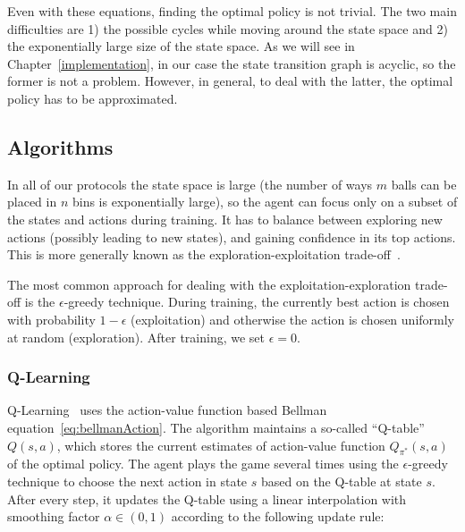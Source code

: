 Even with these equations, finding the optimal policy is not trivial. The two main difficulties are 1) the possible cycles while moving around the state space and 2) the exponentially large size of the state space. As we will see in Chapter~\ref{implementation}, in our case the state transition graph is acyclic, so the former is not a problem. However, in general, to deal with the latter, the optimal policy has to be approximated.



\subsection{Algorithms}


In all of our protocols the state space is large (the number of ways $m$ balls can be placed in $n$ bins is exponentially large), so the agent can focus only on a subset of the states and actions during training. It has to balance between exploring new actions (possibly leading to new states), and gaining confidence in its top actions. This is more generally known as the exploration-exploitation trade-off~\cite{kaelbling1996explorationexploitation}.

The most common approach for dealing with the exploitation-exploration trade-off is the $\epsilon$-greedy technique. During training, the currently best action is chosen with probability $1-\epsilon$ (exploitation) and otherwise the action is chosen uniformly at random (exploration). After training, we set $\epsilon=0$.



\subsubsection*{Q-Learning}


Q-Learning~\cite{watkins1989qlearning} uses the action-value function based Bellman equation~\eqref{eq:bellmanAction}. The algorithm maintains a so-called ``Q-table'' $Q(s,a)$, which stores the current estimates of action-value function $Q_{\pi^*}(s,a)$ of the optimal policy. The agent plays the game several times using the $\epsilon$-greedy technique to choose the next action in state $s$ based on the Q-table at state $s$. After every step, it updates the Q-table using a linear interpolation with smoothing factor $\alpha \in (0,1)$ according to the following update rule:

